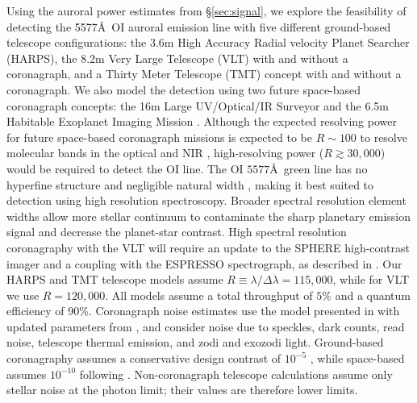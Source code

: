 \documentclass[apjl]{emulateapj}
\begin{document}
Using the auroral power estimates from \S\ref{sec:signal}, we explore the feasibility of detecting the 5577\AA\ OI auroral emission line with five different ground-based telescope configurations: the 3.6m High Accuracy Radial velocity Planet Searcher (HARPS), the 8.2m Very Large Telescope (VLT) with and without a coronagraph, and a Thirty Meter Telescope (TMT) concept with and without a coronagraph. We also model the detection using two future space-based coronagraph concepts: the 16m Large UV/Optical/IR Surveyor \citep[LUVOIR;][]{Kouveliotou2014,Dalcanton2015} and the 6.5m Habitable Exoplanet Imaging Mission \citep[HabEX;][]{Mennesson2016}.  Although the expected resolving power for future space-based coronagraph missions is expected to be $R{\sim}100$ to resolve molecular bands in the optical and NIR \citep{Robinson2016}, high-resolving power ($R\gtrsim 30,000$) would be required to detect the OI line.  The OI $5577$\AA\ green line has no hyperfine structure and negligible natural width \citep{Hunten1967}, making it best suited to detection using high resolution spectroscopy.
Broader spectral resolution element widths allow more stellar continuum to contaminate the sharp planetary emission signal and decrease the planet-star contrast. High spectral resolution coronagraphy with the VLT will require an update to the SPHERE high-contrast imager and a coupling with the ESPRESSO spectrograph, as described in \citet{Lovis2016}. Our HARPS and TMT telescope models assume $R \equiv \lambda / \Delta \lambda = 115,000$, while for VLT we use $R = 120,000$. All models assume a total throughput of $5\%$ and a quantum efficiency of 90\%. Coronagraph noise estimates use the model presented in \citet{Robinson2016} with updated parameters from \citet{Meadows2016}, and consider noise due to speckles, dark counts, read noise, telescope thermal emission, and zodi and exozodi light. Ground-based coronagraphy assumes a conservative design contrast of $10^{-5}$ \citep{Dou2010,Guyon2012}, while space-based assumes $10^{-10}$ following \citet{Meadows2016}. Non-coronagraph telescope calculations assume only stellar noise at the photon limit; their values are therefore lower limits.
\end{document}
